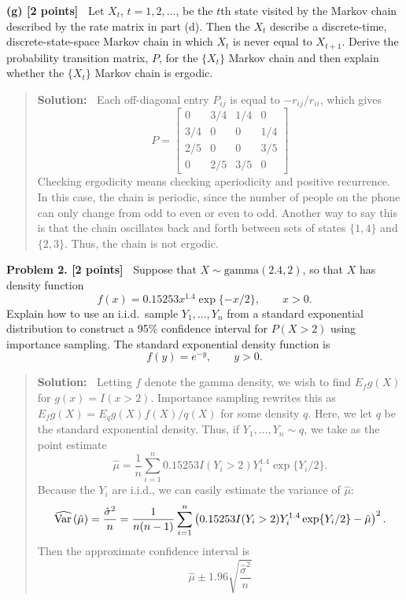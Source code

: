 \documentclass{article}
\newcommand{\svskip}{\vspace{.2in}}
\def\Var{\mathop{\rm Var\,}\nolimits}
\begin{document}
\svskip
{\bf(g) [2 points]\ }
Let $X_t$, $t=1, 2, \ldots$, be the $t$th state visited by the Markov chain described by the
rate matrix in part (d).  Then the $X_t$ describe a discrete-time, discrete-state-space Markov
chain in which $X_t$ is never equal to $X_{t+1}$.  Derive the probability transition matrix,
$P$, for the $\{X_t\}$ Markov chain and then explain whether the $\{X_t\}$ Markov chain is ergodic.
\begin{quotation}{\bf Solution:\ }
Each off-diagonal entry $P_{ij}$ is equal to $-r_{ij}/r_{ii}$, which gives
\[
P= \begin{bmatrix}
0 & 3/4 & 1/4 & 0 \\
3/4 & 0 & 0 & 1/4 \\
2/5 & 0 & 0 & 3/5 \\
0 & 2/5 & 3/5 & 0 
\end{bmatrix}
\]
Checking ergodicity means checking aperiodicity and positive recurrence.  In this case, the 
chain is periodic, since the number of people on the phone can only change from odd to even
or even to odd.  Another way to say this is that the chain oscillates back and forth between sets of
states $\{1, 4\}$ and $\{2, 3\}$.  Thus, the chain is not ergodic.
\end{quotation}


\newpage
{\bf Problem 2. [2 points]\ }
Suppose that $X\sim\mbox{gamma}(2.4,2)$, so that $X$ has density function
\[
f(x) = 0.15253x^{1.4}\exp\{-x/2\}, \qquad x>0.
\]
Explain how to use an i.i.d.~sample $Y_1, \ldots, Y_n$ from a standard exponential
distribution to construct 
a 95\% confidence interval for  $P(X>2)$ using importance sampling.
The standard exponential density function is
\[
f(y) = e^{-y}, \qquad y>0.
\]
\begin{quotation}{\bf Solution:\ }
Letting $f$ denote the gamma density, 
we wish to find $E_f g(X)$ for $g(x)=I(x>2)$.  Importance sampling rewrites this as
$E_f g(X) = E_q g(X)f(X)/q(X)$ for some density $q$.  Here, we let $q$ be the standard
exponential density.  Thus, if $Y_1, \ldots, Y_n\sim q$, we take as the point estimate
\[
\hat\mu = \frac{1}n\sum_{i=1}^n 0.15253I(Y_i>2) Y_i^{1.4} \exp\{Y_i/2\}.
\]
Because the $Y_i$ are i.i.d., we can easily estimate the variance of $\hat\mu$:
\[
\widehat{\Var} (\hat\mu) = \frac{\hat\sigma^2}{n} = \frac{1}{n(n-1)} \sum_{i=1}^n
\left(0.15253 I(Y_i>2) Y_i^{1.4} \exp\{Y_i/2\} - \hat\mu \right)^2.
\]
Then the approximate confidence interval is
\[
\hat\mu \pm 1.96\sqrt{\frac{\hat\sigma^2}{n}}
\]
\end{quotation}
\end{document}
